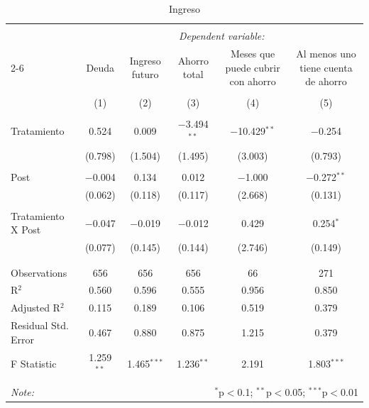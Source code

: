 
\begin{table}[H] \centering 
  \caption{Ingreso} 
  \label{reg_ingreso} 
\tiny 
\begin{tabular}{@{\extracolsep{-7pt}}lccccc} 
\\[-1.8ex]\hline 
\hline \\[-1.8ex] 
 & \multicolumn{5}{c}{\textit{Dependent variable:}} \\ 
\cline{2-6} 
 & Deuda & Ingreso futuro & Ahorro total & Meses que puede cubrir con ahorro & Al menos uno tiene cuenta de ahorro \\ 
\\[-1.8ex] & (1) & (2) & (3) & (4) & (5)\\ 
\hline \\[-1.8ex] 
 Tratamiento & 0.524 & 0.009 & $-$3.494$^{**}$ & $-$10.429$^{**}$ & $-$0.254 \\ 
  & (0.798) & (1.504) & (1.495) & (3.003) & (0.793) \\ 
  & & & & & \\ 
 Post & $-$0.004 & 0.134 & 0.012 & $-$1.000 & $-$0.272$^{**}$ \\ 
  & (0.062) & (0.118) & (0.117) & (2.668) & (0.131) \\ 
  & & & & & \\ 
 Tratamiento X Post & $-$0.047 & $-$0.019 & $-$0.012 & 0.429 & 0.254$^{*}$ \\ 
  & (0.077) & (0.145) & (0.144) & (2.746) & (0.149) \\ 
  & & & & & \\ 
\hline \\[-1.8ex] 
Observations & 656 & 656 & 656 & 66 & 271 \\ 
R$^{2}$ & 0.560 & 0.596 & 0.555 & 0.956 & 0.850 \\ 
Adjusted R$^{2}$ & 0.115 & 0.189 & 0.106 & 0.519 & 0.379 \\ 
Residual Std. Error & 0.467 & 0.880 & 0.875 & 1.215 & 0.379 \\ 
F Statistic & 1.259$^{**}$ & 1.465$^{***}$ & 1.236$^{**}$ & 2.191 & 1.803$^{***}$ \\ 
\hline 
\hline \\[-1.8ex] 
\textit{Note:}  & \multicolumn{5}{r}{$^{*}$p$<$0.1; $^{**}$p$<$0.05; $^{***}$p$<$0.01} \\ 
\end{tabular} 
\end{table} 
